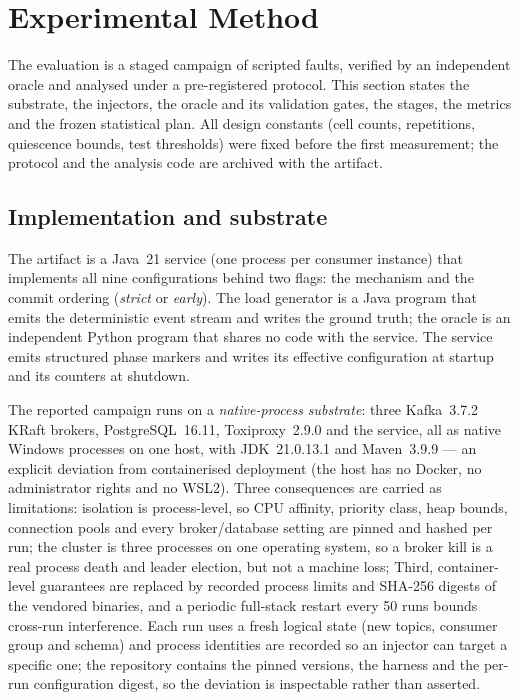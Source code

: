 
\section{Experimental Method}
\label{sec:method}

The evaluation is a staged campaign of scripted faults, verified by an independent oracle and
analysed under a pre-registered protocol. This section states the substrate, the injectors, the
oracle and its validation gates, the stages, the metrics and the frozen statistical plan. All
design constants (cell counts, repetitions, quiescence bounds, test thresholds) were fixed before
the first measurement; the protocol and the analysis code are archived with the artifact.

\subsection{Implementation and substrate}
\label{sec:method:substrate}

The artifact is a Java~21 service (one process per consumer instance) that implements all nine
configurations behind two flags: the mechanism and the commit ordering (\emph{strict} or
\emph{early}). The load generator is a Java program that emits the deterministic event stream and
writes the ground truth; the oracle is an independent Python program that shares no code with the
service. The service emits structured phase markers and writes its effective configuration at
startup and its counters at shutdown.

The reported campaign runs on a \emph{native-process substrate}: three Kafka~3.7.2 KRaft brokers,
PostgreSQL~16.11, Toxiproxy~2.9.0 and the service, all as native Windows processes on one host,
with JDK~21.0.13.1 and Maven~3.9.9 --- an explicit deviation from containerised deployment (the
host has no Docker, no administrator rights and no WSL2). Three consequences are carried as
limitations: isolation is process-level, so CPU affinity, priority class, heap bounds, connection
pools and every broker/database setting are pinned and hashed per run; the cluster is three
processes on one operating system, so a broker kill is a real process death and leader election,
but not a machine loss; Third, container-level guarantees are replaced by recorded process limits and SHA-256 digests
of the vendored binaries, and a periodic full-stack restart every 50 runs bounds cross-run
interference. Each run uses a fresh logical state (new topics, consumer group and schema) and
process identities are recorded so an injector can target a specific one; the repository contains
the pinned versions, the harness and the per-run configuration digest, so the deviation is
inspectable rather than asserted.

